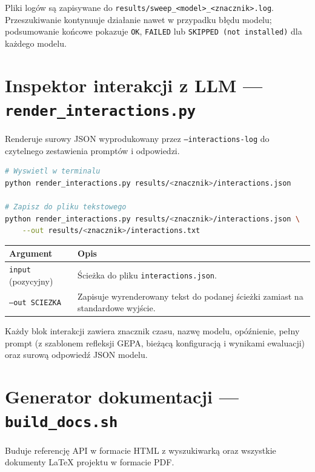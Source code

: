 \documentclass[11pt,a4paper]{article}
\begin{document}
Pliki logów są zapisywane do
\texttt{results/sweep\_<model>\_<znacznik>.log}.
Przeszukiwanie kontynuuje działanie nawet w przypadku błędu modelu;
podsumowanie końcowe pokazuje \texttt{OK}, \texttt{FAILED} lub
\texttt{SKIPPED (not installed)} dla każdego modelu.

\section{Inspektor interakcji z LLM --- \texttt{render\_interactions.py}}

Renderuje surowy JSON wyprodukowany przez \texttt{--interactions-log}
do czytelnego zestawienia promptów i odpowiedzi.

\begin{lstlisting}[language=bash]
# Wyswietl w terminalu
python render_interactions.py results/<znacznik>/interactions.json

# Zapisz do pliku tekstowego
python render_interactions.py results/<znacznik>/interactions.json \
    --out results/<znacznik>/interactions.txt
\end{lstlisting}

\begin{longtable}{@{}p{4.0cm} p{10.0cm}@{}}
\toprule
\textbf{Argument} & \textbf{Opis} \\
\midrule
\endhead
\texttt{input} (pozycyjny) & Ścieżka do pliku \texttt{interactions.json}. \\[4pt]
\texttt{--out SCIEZKA}     & Zapisuje wyrenderowany tekst do podanej ścieżki
                             zamiast na standardowe wyjście. \\
\bottomrule
\end{longtable}

Każdy blok interakcji zawiera znacznik czasu, nazwę modelu, opóźnienie,
pełny prompt (z szablonem refleksji GEPA, bieżącą konfiguracją i wynikami
ewaluacji) oraz surową odpowiedź JSON modelu.

\section{Generator dokumentacji --- \texttt{build\_docs.sh}}

Buduje referencję API w formacie HTML z wyszukiwarką oraz wszystkie dokumenty
LaTeX projektu w formacie PDF.
\end{document}
